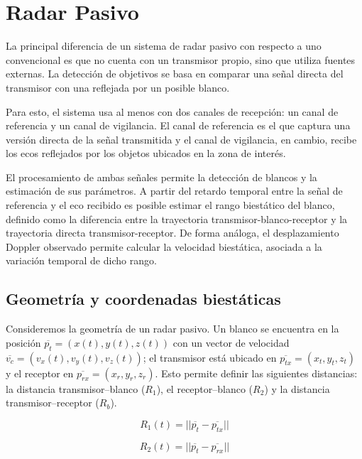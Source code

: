 \chapter{Radar Pasivo}
	La principal diferencia de un sistema de radar pasivo con respecto a uno convencional es que no cuenta con un transmisor propio, sino que utiliza fuentes externas. La detección de objetivos se basa en comparar una señal directa del transmisor con una reflejada por un posible blanco.

	Para esto, el sistema usa al menos con dos canales de recepción: un canal de referencia y un canal de vigilancia. El canal de referencia es el que captura una versión directa de la señal transmitida y el canal de vigilancia, en cambio, recibe los ecos reflejados por los objetos ubicados en la zona de interés.

	El procesamiento de ambas señales permite la detección de blancos y la estimación de sus parámetros. A partir del retardo temporal entre la señal de referencia y el eco recibido es posible estimar el rango biestático del blanco, definido como la diferencia entre la trayectoria transmisor-blanco-receptor y la trayectoria directa transmisor-receptor. De forma análoga, el desplazamiento Doppler observado permite calcular la velocidad biestática, asociada a la variación temporal de dicho rango.



	\section{Geometría y coordenadas biestáticas}

	Consideremos la geometría de un radar pasivo. Un blanco se encuentra en la posición \(\overline{p_t} = (x(t), y(t), z(t))\) con un vector de velocidad \(\overline{v_c} = (v_x(t), v_y(t), v_z(t))\); el transmisor está ubicado en \(\overline{p_{tx}} =(x_{t}, y_{t}, z_{t})\) y el receptor en \(\overline{p_{rx}} =(x_{r}, y_{r}, z_{r})\). Esto permite definir las siguientes distancias: la distancia transmisor--blanco ($R_1$), el receptor--blanco ($R_2$) y la distancia transmisor--receptor ($R_b$).

	\begin{equation}
		R_1(t) = || \overline{p_{t}} - \overline{p_{tx}} ||
	\end{equation}

	\begin{equation}
		R_2(t) = || \overline{p_{t}} - \overline{p_{rx}} ||
	\end{equation}


